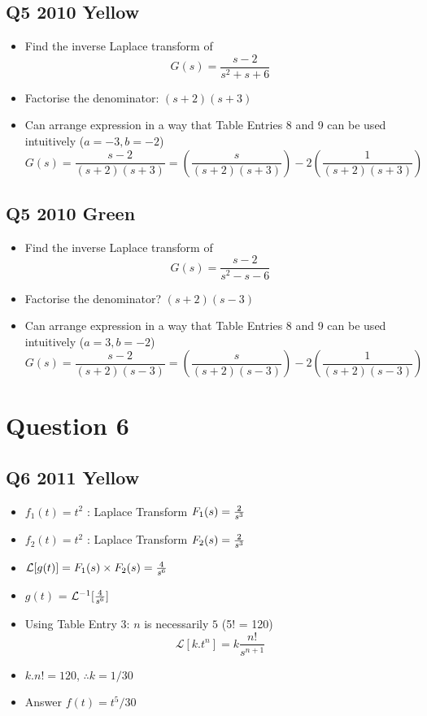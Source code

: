 \documentclass[11pt,a4paper,titlepage,oneside,openany]{article}
\numberwithin{equation}{section}
\numberwithin{algorithm}{section}
\numberwithin{figure}{section}
\numberwithin{table}{section}
\begin{document}
\subsection*{Q5 2010 Yellow}
\begin{itemize}
\item Find the inverse Laplace transform of
\[ G(s) = \frac{s-2}{s^2 + s + 6} \]
\item Factorise the denominator:  $(s+2)(s+3)$
\item Can arrange expression in a way that Table Entries 8 and 9 can be used intuitively ($a=-3, b=-2$)
\[ G(s) = \frac{s-2}{(s+2)(s+3)} = \left(\frac{s}{(s+2)(s+3)} \right)-2\left(\frac{1}{(s+2)(s+3)}\right) \]
\end{itemize}
\subsection*{Q5 2010 Green}
\begin{itemize}
\item Find the inverse Laplace transform of
\[ G(s) = \frac{s-2}{s^2 - s - 6} \]
\item Factorise the denominator?  $(s+2)(s-3)$
\item Can arrange expression in a way that Table Entries 8 and 9 can be used intuitively ($a=3, b=-2$)
\[ G(s) = \frac{s-2}{(s+2)(s-3)} = \left(\frac{s}{(s+2)(s-3)} \right)-2\left(\frac{1}{(s+2)(s-3)}\right) \]
\end{itemize}
\section*{Question 6}

\subsection*{Q6 2011 Yellow}
\begin{itemize}
\item $f_1(t)=t^2$ : Laplace Transform $F_1(s)={2 \over s^3}$
\item $f_2(t)=t^2$ : Laplace Transform $F_2(s)={2 \over s^3}$
\item $\mathcal{L}[g(t)] = F_1(s)\times F_2(s) = {4 \over s^6}$
\item $g(t)$ = $\mathcal{L}^{-1}[{4 \over s^6}]$
\item Using Table Entry 3: $n$ is necessarily $5$ (5! = 120)
\[ \mathcal{L}[k.t^n] = k\frac{n!}{s^{n+1}} \]
\item $k.n! = 120$, $\therefore k=1/30$
\item Answer $f(t) = t^5/30$
\end{itemize}
\end{document}
